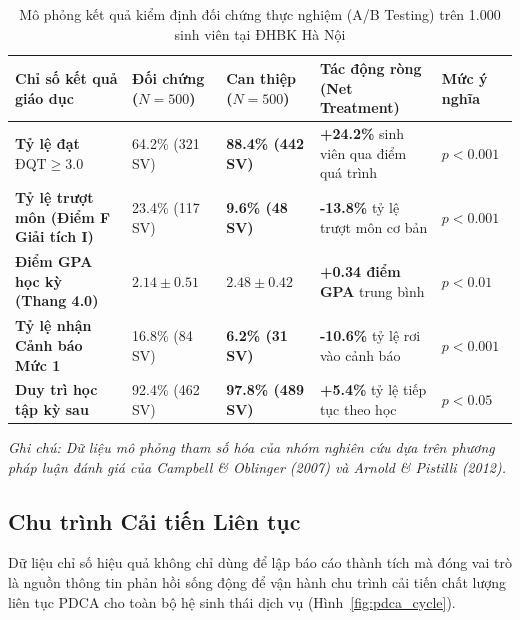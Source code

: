 \begin{table}[htbp]
\centering
\caption{Mô phỏng kết quả kiểm định đối chứng thực nghiệm (A/B Testing) trên 1.000 sinh viên tại ĐHBK Hà Nội}
\label{tab:ab_testing}
\vspace{0.2cm}
\fontsize{8}{10}\selectfont
\begin{tabularx}{\textwidth}{|L{3.5cm}|C{2.3cm}|C{2.3cm}|Y|C{1.8cm}|}
\hline
\textbf{Chỉ số kết quả giáo dục} & \textbf{Đối chứng ($N=500$)} & \textbf{Can thiệp ($N=500$)} & \textbf{Tác động ròng (Net Treatment)} & \textbf{Mức ý nghĩa} \\
\hline
\textbf{Tỷ lệ đạt $\text{ĐQT} \ge 3.0$} & 64.2\% (321 SV) & \textbf{88.4\% (442 SV)} & \textbf{+24.2\%} sinh viên qua điểm quá trình & $p < 0.001$ \\
\hline
\textbf{Tỷ lệ trượt môn (Điểm F Giải tích I)} & 23.4\% (117 SV) & \textbf{9.6\% (48 SV)} & \textbf{-13.8\%} tỷ lệ trượt môn cơ bản & $p < 0.001$ \\
\hline
\textbf{Điểm GPA học kỳ (Thang 4.0)} & $2.14 \pm 0.51$ & \textbf{$2.48 \pm 0.42$} & \textbf{+0.34 điểm GPA} trung bình & $p < 0.01$ \\
\hline
\textbf{Tỷ lệ nhận Cảnh báo Mức 1} & 16.8\% (84 SV) & \textbf{6.2\% (31 SV)} & \textbf{-10.6\%} tỷ lệ rơi vào cảnh báo & $p < 0.001$ \\
\hline
\textbf{Duy trì học tập kỳ sau} & 92.4\% (462 SV) & \textbf{97.8\% (489 SV)} & \textbf{+5.4\%} tỷ lệ tiếp tục theo học & $p < 0.05$ \\
\hline
\end{tabularx}
\begin{flushleft}
\textit{\fontsize{8}{9.5}\selectfont Ghi chú: Dữ liệu mô phỏng tham số hóa của nhóm nghiên cứu dựa trên phương pháp luận đánh giá của Campbell \& Oblinger (2007) và Arnold \& Pistilli (2012).}
\end{flushleft}
\end{table}

\subsection{Chu trình Cải tiến Liên tục}
Dữ liệu chỉ số hiệu quả không chỉ dùng để lập báo cáo thành tích mà đóng vai trò là nguồn thông tin phản hồi sống động để vận hành chu trình cải tiến chất lượng liên tục PDCA cho toàn bộ hệ sinh thái dịch vụ (Hình~\ref{fig:pdca_cycle}).

